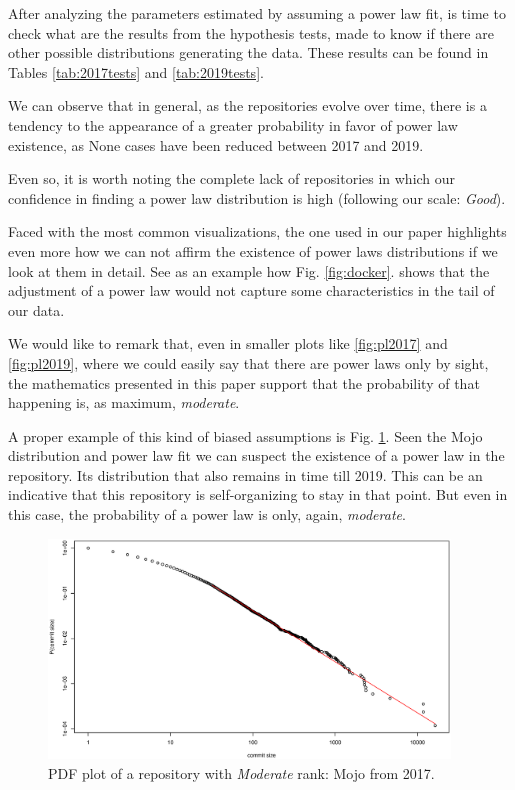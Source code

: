 \documentclass[conference]{IEEEtran}
\begin{document}
After analyzing the parameters estimated by assuming a power law fit,
is time to check what are %
the results from the hypothesis tests, made to know if there are other
possible distributions generating the data. These results can be found
in Tables \ref{tab:2017tests} and \ref{tab:2019tests}.

We can observe that in general, as the repositories evolve over time,
there is a tendency to the appearance of a greater probability in
favor of power law existence, as None cases have been reduced between
2017 and 2019.

Even so, it is worth noting the complete lack of repositories in which
our confidence in finding a power law distribution is high (following
our scale: \textit{Good}).

Faced with the most common visualizations, the one used in our paper
highlights even more how we can not affirm the existence of power laws
distributions if we look at them in detail. See as an example how
Fig. \ref{fig:docker}. shows that the adjustment of a power law would
not capture some characteristics in the tail of our data.

We would like to remark that, even in smaller plots like
\ref{fig:pl2017} and \ref{fig:pl2019}, where we could easily say that
there are power laws only by sight, the mathematics presented in this
paper support that the probability of that happening is, as maximum,
\textit{ moderate}.

A proper example of this kind of biased assumptions is
Fig. \ref{fig:mojo}. Seen the Mojo distribution and power law fit we
can suspect the existence of a power law in the repository. Its
distribution that also remains in time till 2019. This can be an
indicative that this repository is self-organizing to stay in that
point. But even in this case, the probability of a power law is only,
again, \textit{moderate}.

\begin{figure}[htbp]
  \centerline{\includegraphics[width=0.95\textwidth]{plots/mojo-2017.eps}}
  \caption{PDF plot of a repository with \textit{Moderate} rank: Mojo
    from 2017.}
  \label{fig:mojo}
\end{figure}
\end{document}
